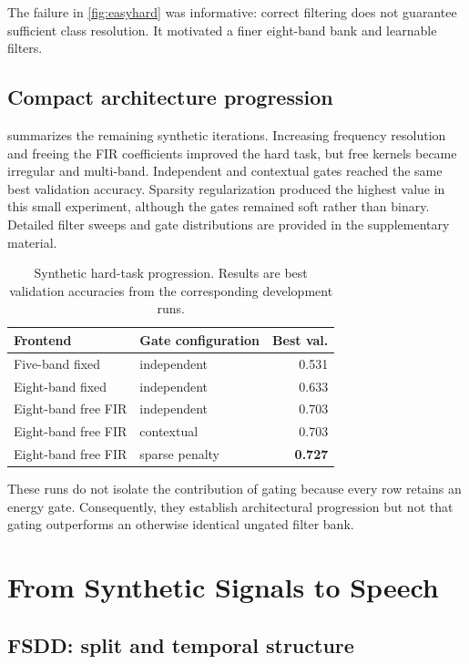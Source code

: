 \documentclass[10pt,twocolumn]{article}
\begin{document}
The failure in \cref{fig:easyhard} was informative: correct filtering does not
guarantee sufficient class resolution. It motivated a finer eight-band bank
and learnable filters.

\subsection{Compact architecture progression}

 summarizes the remaining synthetic iterations.
Increasing frequency resolution and freeing the FIR coefficients improved the
hard task, but free kernels became irregular and multi-band. Independent and
contextual gates reached the same best validation accuracy. Sparsity
regularization produced the highest value in this small experiment, although
the gates remained soft rather than binary. Detailed filter sweeps and gate
distributions are provided in the supplementary material.

\begin{table}[t]
\centering
\caption{Synthetic hard-task progression. Results are best validation
accuracies from the corresponding development runs.}
\label{tab:syntheticprogression}
\small
\begin{tabular}{@{}llr@{}}
\toprule
Frontend & Gate configuration & Best val. \\
\midrule
Five-band fixed & independent & 0.531 \\
Eight-band fixed & independent & 0.633 \\
Eight-band free FIR & independent & 0.703 \\
Eight-band free FIR & contextual & 0.703 \\
Eight-band free FIR & sparse penalty & \textbf{0.727} \\
\bottomrule
\end{tabular}
\end{table}

These runs do not isolate the contribution of gating because every row retains
an energy gate. Consequently, they establish architectural progression but not
that gating outperforms an otherwise identical ungated filter bank.
\FloatBarrier

\section{From Synthetic Signals to Speech}

\subsection{FSDD: split and temporal structure}
\end{document}

